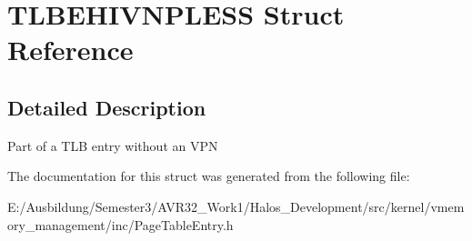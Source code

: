 \hypertarget{struct_t_l_b_e_h_i_v_n_p_l_e_s_s}{
\section{TLBEHIVNPLESS Struct Reference}
\label{struct_t_l_b_e_h_i_v_n_p_l_e_s_s}
}


\subsection{Detailed Description}
Part of a TLB entry without an VPN 

The documentation for this struct was generated from the following file:\begin{CompactItemize}
\item 
E:/Ausbildung/Semester3/AVR32\_\-Work1/Halos\_\-Development/src/kernel/vmemory\_\-management/inc/PageTableEntry.h\end{CompactItemize}
